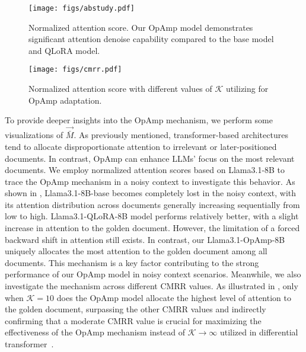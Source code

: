 \begin{figure}[!tb]
    \centering
    \texttt{[image: figs/abstudy.pdf]} 
    \caption{Normalized attention score. Our OpAmp model demonstrates significant attention denoise capability compared to the base model and QLoRA model.} 
    \label{fig:abstudy}
\end{figure}

\begin{figure}[!tb]
    \centering
    \texttt{[image: figs/cmrr.pdf]} 
    \caption{Normalized attention score with different values of $\mathcal{K}$ utilizing for OpAmp adaptation.} 
    \label{fig:cmrr}
\end{figure}

To provide deeper insights into the OpAmp mechanism, we perform some visualizations of $\vec{\bar{M}}$. 
As previously mentioned, transformer-based architectures tend to allocate disproportionate attention to irrelevant or later-positioned documents. 
In contrast, OpAmp can enhance LLMs' focus on the most relevant documents. 
We employ normalized attention scores based on Llama3.1-8B to trace the OpAmp mechanism in a noisy context to investigate this behavior.
As shown in , Llama3.1-8B-base becomes completely lost in the noisy context, with its attention distribution across documents generally increasing sequentially from low to high.
Llama3.1-QLoRA-8B model performs relatively better, with a slight increase in attention to the golden document.
However, the limitation of a forced backward shift in attention still exists. 
In contrast, our Llama3.1-OpAmp-8B uniquely allocates the most attention to the golden document among all documents. 
This mechanism is a key factor contributing to the strong performance of our OpAmp model in noisy context scenarios.
Meanwhile, we also investigate the mechanism across different CMRR values.
As illustrated in , only when $\mathcal{K}=10$ does the OpAmp model allocate the highest level of attention to the golden document, surpassing the other CMRR values and indirectly confirming that a moderate CMRR value is crucial for maximizing the effectiveness of the OpAmp mechanism instead of $\mathcal{K}\rightarrow \infty$ utilized in differential transformer~\cite{ye2025difftrans}.